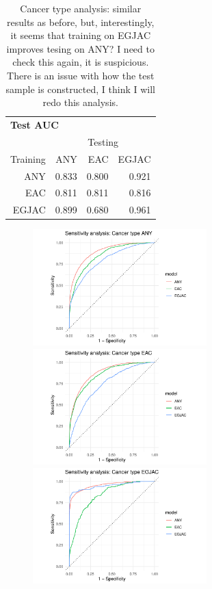 \documentclass[12pt]{article}
\begin{document}
\clearpage
\begin{table}[h]
\centering
\begin{tabular}{rrrr}
\toprule
  \multicolumn{4}{l}{\textbf{Test AUC}}\\
  & \multicolumn{3}{c}{Testing}\\ \cmidrule(l){2-4}
Training & ANY & EAC & EGJAC \\ 
  \midrule
ANY & 0.833 & 0.800 & 0.921 \\ 
  EAC & 0.811 & 0.811 & 0.816 \\ 
  EGJAC & 0.899 & 0.680 & 0.961 \\ 
   \bottomrule
\end{tabular}
\caption{Cancer type analysis: similar results as before, but, interestingly, 
it seems that training on EGJAC improves tesing on ANY? I need to check this again,
 it is suspicious. There is an issue with how the test sample is constructed,
I think I will redo this analysis.}
\end{table}


\clearpage
\begin{figure}[h]
\centering
\includegraphics[width=0.6\textwidth]{figures/roc_ANY.pdf}
\includegraphics[width=0.6\textwidth]{figures/roc_EAC.pdf}
\includegraphics[width=0.6\textwidth]{figures/roc_EGJAC.pdf}
\end{figure}
\end{document}

